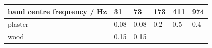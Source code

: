 \documentclass[]{scrreprt}
\begin{document}
\begin{longtable}[c]{@{}llllll@{}}
\toprule
\begin{minipage}[b]{0.30\columnwidth}\raggedright\strut
band centre frequency / Hz
\strut\end{minipage} &
\begin{minipage}[b]{0.08\columnwidth}\raggedright\strut
31
\strut\end{minipage} &
\begin{minipage}[b]{0.08\columnwidth}\raggedright\strut
73
\strut\end{minipage} &
\begin{minipage}[b]{0.08\columnwidth}\raggedright\strut
173
\strut\end{minipage} &
\begin{minipage}[b]{0.08\columnwidth}\raggedright\strut
411
\strut\end{minipage} &
\begin{minipage}[b]{0.20\columnwidth}\raggedright\strut
974
\strut\end{minipage}\tabularnewline
\midrule
\endhead
\begin{minipage}[t]{0.30\columnwidth}\raggedright\strut
plaster
\strut\end{minipage} &
\begin{minipage}[t]{0.08\columnwidth}\raggedright\strut
0.08
\strut\end{minipage} &
\begin{minipage}[t]{0.08\columnwidth}\raggedright\strut
0.08
\strut\end{minipage} &
\begin{minipage}[t]{0.08\columnwidth}\raggedright\strut
0.2
\strut\end{minipage} &
\begin{minipage}[t]{0.08\columnwidth}\raggedright\strut
0.5
\strut\end{minipage} &
\begin{minipage}[t]{0.20\columnwidth}\raggedright\strut
0.4
\strut\end{minipage}\tabularnewline
\begin{minipage}[t]{0.30\columnwidth}\raggedright\strut
wood
\strut\end{minipage} &
\begin{minipage}[t]{0.08\columnwidth}\raggedright\strut
0.15
\strut\end{minipage} &
\begin{minipage}[t]{0.08\columnwidth}\raggedright\strut
0.15
\strut\end{minipage} &

\end{longtable}
\end{document}
